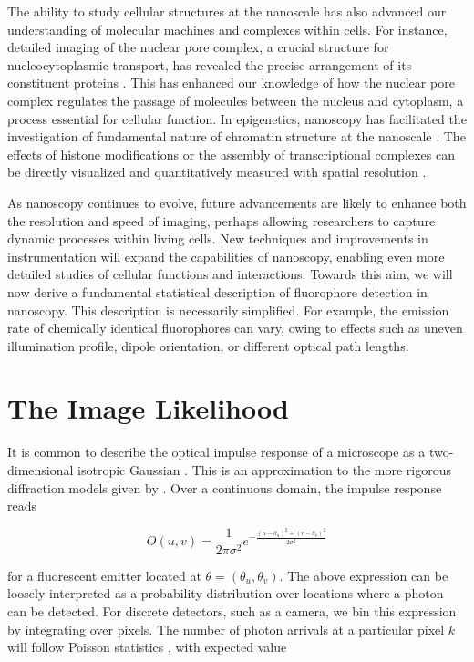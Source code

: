 The ability to study cellular structures at the nanoscale has also advanced our understanding of molecular machines and complexes within cells. For instance, detailed imaging of the nuclear pore complex, a crucial structure for nucleocytoplasmic transport, has revealed the precise arrangement of its constituent proteins \parencite{Wang2023}. This has enhanced our knowledge of how the nuclear pore complex regulates the passage of molecules between the nucleus and cytoplasm, a process essential for cellular function. In epigenetics, nanoscopy has facilitated the investigation of fundamental nature of chromatin structure at the nanoscale \parencite{Ricci2015}. The effects of histone modifications or the assembly of transcriptional complexes can be directly visualized and quantitatively measured with spatial resolution \parencite{Ricci2015,Nozaki2017,Boettiger2016}.

As nanoscopy continues to evolve, future advancements are likely to enhance both the resolution and speed of imaging, perhaps allowing researchers to capture dynamic processes within living cells. New techniques and improvements in instrumentation will expand the capabilities of nanoscopy, enabling even more detailed studies of cellular functions and interactions. Towards this aim, we will now derive a fundamental statistical description of fluorophore detection in nanoscopy. This description is necessarily simplified. For example, the emission rate of chemically identical fluorophores can vary, owing to effects such as uneven illumination profile, dipole orientation, or different optical path lengths.


\section{The Image Likelihood}

It is common to describe the optical impulse response of a microscope as a two-dimensional isotropic Gaussian \parencite{Zhang2007}. This is an approximation to the more rigorous diffraction models given by \parencite{Richards1959,Gibson1989}. Over a continuous domain, the impulse response reads

\begin{equation}
O(u,v) = \frac{1}{2\pi\sigma^{2}}e^{-\frac{(u-\theta_{u})^{2}+(v-\theta_{v})^{2}}{2\sigma^{2}}}
\end{equation}

for a fluorescent emitter located at $\theta = (\theta_u,\theta_v)$. The above expression can be loosely interpreted as a probability distribution over locations where a photon can be detected. For discrete detectors, such as a camera, we bin this expression by integrating over pixels. The number of photon arrivals at a particular pixel $k$ will follow Poisson statistics \parencite{Smith2010,Huang2013}, with expected value

